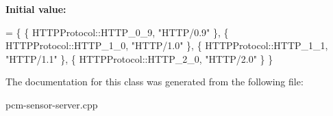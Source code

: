 {\bfseries Initial value\+:}
\begin{DoxyCode}
= \{
        \{ HTTPProtocol::HTTP\_0\_9, \textcolor{stringliteral}{"HTTP/0.9"} \},
        \{ HTTPProtocol::HTTP\_1\_0, \textcolor{stringliteral}{"HTTP/1.0"} \},
        \{ HTTPProtocol::HTTP\_1\_1, \textcolor{stringliteral}{"HTTP/1.1"} \},
        \{ HTTPProtocol::HTTP\_2\_0, \textcolor{stringliteral}{"HTTP/2.0"} \}
    \}
\end{DoxyCode}


The documentation for this class was generated from the following file\+:\begin{DoxyCompactItemize}
\item 
pcm-\/sensor-\/server.\+cpp\end{DoxyCompactItemize}
